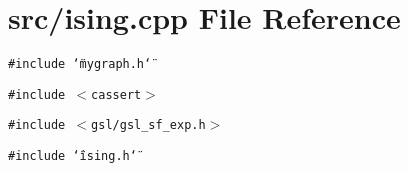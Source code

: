 \section{src/ising.cpp File Reference}
\label{ising_8cpp}
{\tt \#include \char`\"{}mygraph.h\char`\"{}}\par
{\tt \#include $<$cassert$>$}\par
{\tt \#include $<$gsl/gsl\_\-sf\_\-exp.h$>$}\par
{\tt \#include \char`\"{}ising.h\char`\"{}}\par
